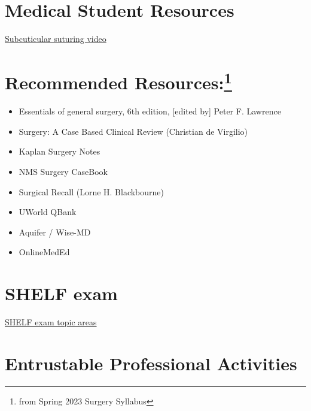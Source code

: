 \documentclass[
]{book}
\providecommand{\tightlist}{%
  \setlength{\itemsep}{0pt}\setlength{\parskip}{0pt}}
\begin{document}
\hypertarget{medical-student-resources}{%
\section{Medical Student Resources}\label{medical-student-resources}}

\href{https://www.youtube.com/watch?v=M3vISruyFkI}{Subcuticular suturing video}

\hypertarget{recommended-resources}{%
\section[Recommended Resources:]{\texorpdfstring{Recommended Resources:\footnote{from Spring 2023 Surgery Syllabus}}{Recommended Resources:}}\label{recommended-resources}}

\begin{itemize}
\tightlist
\item
  Essentials of general surgery, 6th edition, {[}edited by{]} Peter F. Lawrence
\item
  Surgery: A Case Based Clinical Review (Christian de Virgilio)
\item
  Kaplan Surgery Notes
\item
  NMS Surgery CaseBook
\item
  Surgical Recall (Lorne H. Blackbourne)
\item
  UWorld QBank
\item
  Aquifer / Wise-MD
\item
  OnlineMedEd
\end{itemize}

\hypertarget{shelf-exam}{%
\section{SHELF exam}\label{shelf-exam}}

\href{https://www.nbme.org/subject-exams/clinical-science/surgery}{SHELF exam topic areas}

\hypertarget{entrustable-professional-activities}{%
\section{Entrustable Professional Activities}\label{entrustable-professional-activities}}
\end{document}
